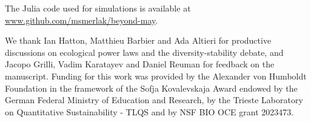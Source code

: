 \documentclass[
 prl,
 twocolumn,
 amsmath,
 amssymb,
 aps,
]{revtex4-2}
\begin{document}
\medskip

The Julia code used for simulations is available at \url{www.github.com/msmerlak/beyond-may}.

\medskip

\begin{acknowledgments}
We thank Ian Hatton, Matthieu Barbier and Ada Altieri for productive discussions on ecological power laws and the diversity-stability debate, and Jacopo Grilli, Vadim Karatayev and Daniel Reuman for feedback on the manuscript.
Funding for this work was provided by the Alexander von Humboldt Foundation in the framework of the Sofja Kovalevskaja Award endowed by the German Federal Ministry of Education and Research, by the Trieste Laboratory on Quantitative Sustainability - TLQS and by NSF BIO OCE grant 2023473.
\end{acknowledgments}

\medskip



\end{document}

